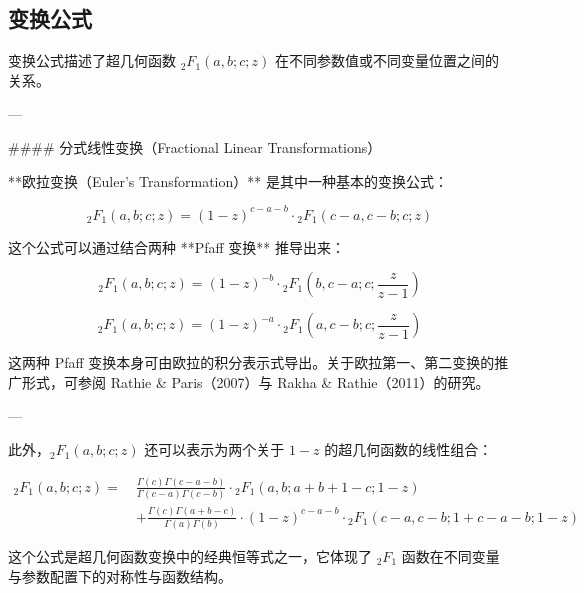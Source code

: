 \subsection{变换公式}
变换公式描述了超几何函数 ${}_2F_1(a, b; c; z)$ 在不同参数值或不同变量位置之间的关系。

---

#### 分式线性变换（Fractional Linear Transformations）

**欧拉变换（Euler’s Transformation）** 是其中一种基本的变换公式：

$$
{}_2F_1(a, b; c; z) = (1 - z)^{c - a - b} \cdot {}_2F_1(c - a, c - b; c; z)
$$

这个公式可以通过结合两种 **Pfaff 变换** 推导出来：

$$
{}_2F_1(a, b; c; z) = (1 - z)^{-b} \cdot {}_2F_1\left(b, c - a; c; \frac{z}{z - 1}\right)
$$

$$
{}_2F_1(a, b; c; z) = (1 - z)^{-a} \cdot {}_2F_1\left(a, c - b; c; \frac{z}{z - 1}\right)
$$

这两种 Pfaff 变换本身可由欧拉的积分表示式导出。关于欧拉第一、第二变换的推广形式，可参阅 Rathie & Paris（2007）与 Rakha & Rathie（2011）的研究。

---

此外，${}_2F_1(a, b; c; z)$ 还可以表示为两个关于 $1 - z$ 的超几何函数的线性组合：

$$
\begin{aligned}
{}_2F_1(a, b; c; z) =\ & \frac{\Gamma(c) \Gamma(c - a - b)}{\Gamma(c - a) \Gamma(c - b)} \cdot {}_2F_1(a, b; a + b + 1 - c; 1 - z) \\
&+ \frac{\Gamma(c) \Gamma(a + b - c)}{\Gamma(a) \Gamma(b)} \cdot (1 - z)^{c - a - b} \cdot {}_2F_1(c - a, c - b; 1 + c - a - b; 1 - z)
\end{aligned}
$$

这个公式是超几何函数变换中的经典恒等式之一，它体现了 ${}_2F_1$ 函数在不同变量与参数配置下的对称性与函数结构。
